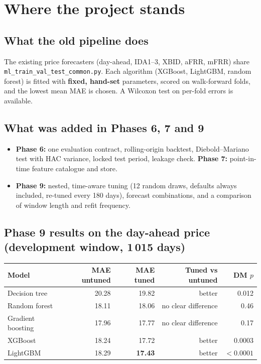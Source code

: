 \documentclass[11pt,a4paper]{article}
\begin{document}
\section{Where the project stands}

\subsection{What the old pipeline does}

The existing price forecasters (day-ahead, IDA1--3, XBID, aFRR, mFRR) share \texttt{ml\_\allowbreak train\_\allowbreak val\_\allowbreak test\_\allowbreak common.py}. Each
algorithm (XGBoost, LightGBM, random forest) is fitted with \textbf{fixed, hand-set} parameters, scored on
walk-forward folds, and the lowest mean MAE is chosen. A Wilcoxon test on per-fold errors is available.

\subsection{What was added in Phases 6, 7 and 9}

\begin{itemize}
\item \textbf{Phase 6:} one evaluation contract, rolling-origin backtest, Diebold--Mariano test with HAC variance, locked
      test period, leakage check. \textbf{Phase 7:} point-in-time feature catalogue and store.
\item \textbf{Phase 9:} nested, time-aware tuning (12 random draws, defaults always included, re-tuned every 180 days),
      forecast combinations, and a comparison of window length and refit frequency.
\end{itemize}

\subsection{Phase 9 results on the day-ahead price (development window, 1\,015 days)}

\begin{center}
\begin{tabular}{@{}lrrrr@{}}
\toprule
Model & MAE untuned & MAE tuned & Tuned vs untuned & DM $p$ \\
\midrule
Decision tree     & 20.28 & 19.82 & better & 0.012 \\
Random forest     & 18.11 & 18.06 & no clear difference & 0.46 \\
Gradient boosting & 17.96 & 17.77 & no clear difference & 0.17 \\
XGBoost           & 18.24 & 17.72 & better & 0.0003 \\
LightGBM          & 18.29 & \textbf{17.43} & better & $<0.0001$ \\
\bottomrule
\end{tabular}
\end{center}
\end{document}
